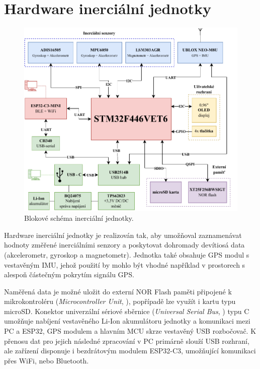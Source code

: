 \chapter{Hardware inerciální jednotky}

\begin{figure}[h]
    \centering
    \includegraphics[width=\textwidth]{obrazky/IMUnav_H00_block}
    \caption{Blokové schéma inerciální jednotky.}
\end{figure}

Hardware inerciální jednotky je realizován tak, aby umožňoval zaznamenávat hodnoty změřené inerciálními senzory a poskytovat dohromady devítiosá data (akcelerometr, gyroskop a magnetometr). Jednotka také obsahuje \ac{GPS} modul s vestavěným \ac{IMU}, jehož použití by mohlo být vhodné například v prostorech s alespoň částečným pokrytím signálu \ac{GPS}.

Naměřená data je možné uložit do externí NOR Flash paměti připojené k mikrokontroléru (\emph{Microcontroller
Unit}, ), popřípadě lze využít i kartu typu microSD. Konektor univerzální sériové sběrnice (\emph{Universal Serial Bus}, ) typu C umožňuje nabíjení vestavěného Li-Ion akumulátoru jednotky a komunikaci mezi PC a ESP32, \ac{GPS} modulem a hlavním \ac{MCU} skrze vestavěný \ac{USB} rozbočovač. K přenosu dat pro jejich následné zpracování v PC primárně slouží USB rozhraní, ale zařízení disponuje i bezdrátovým modulem ESP32-C3, umožňující komunikaci přes WiFi, nebo Bluetooth.

